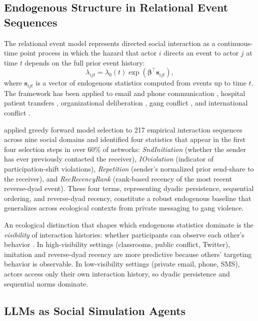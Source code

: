 \documentclass[11pt]{article}
\begin{document}
\subsection{Endogenous Structure in Relational Event Sequences}

The relational event model \citep{butts_sm_2008} represents directed social
interaction as a continuous-time point process in which the hazard that actor
$i$ directs an event to actor $j$ at time $t$ depends on the full prior event
history:
\[
  \lambda_{ijt} = \lambda_0(t)\exp\!\left(\boldsymbol{\beta}^\top
  \mathbf{s}_{ijt}\right),
\]
where $\mathbf{s}_{ijt}$ is a vector of endogenous statistics computed from
events up to time $t$. The framework has been applied to email and phone
communication \citep{vu2017relational}, hospital patient transfers
\citep{liang2014organizational}, organizational deliberation
\citep{kitts2017investigating}, gang conflict \citep{duxbury2021shining,%
gravel2023rivalries}, and international conflict \citep{renshaw2023modeling}.

\citet{gibson2025four} applied greedy forward model selection to 217 empirical
interaction sequences across nine social domains and identified four statistics
that appear in the first four selection steps in over 60\% of networks:
\textit{SndInitiation} (whether the sender has ever previously contacted the
receiver), \textit{IOviolation} (indicator of participation-shift violations),
\textit{Repetition} (sender's normalized prior send-share to the receiver), and
\textit{RecRecencyRank} (rank-based recency of the most recent reverse-dyad
event). These four terms, representing dyadic persistence, sequential ordering,
and reverse-dyad recency, constitute a robust endogenous baseline that
generalizes across ecological contexts from private messaging to gang violence.

An ecological distinction that shapes which endogenous statistics dominate is
the \emph{visibility} of interaction histories: whether participants can observe
each other's behavior \citep{gibson2025four}. In high-visibility settings
(classrooms, public conflict, Twitter), imitation and reverse-dyad recency are
more predictive because others' targeting behavior is observable. In
low-visibility settings (private email, phone, SMS), actors access only their
own interaction history, so dyadic persistence and sequential norms dominate.

\subsection{LLMs as Social Simulation Agents}
\end{document}
